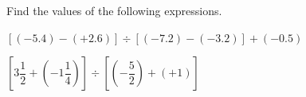  Find the values of the following expressions.

\begin{subparts}
  \item $[(-5.4)-(+2.6)]\div[(-7.2)-(-3.2)]+(-0.5)$

  \item $\left[3\dfrac{1}{2}+\left(-1\dfrac{1}{4}\right)\right]\div\left[\left(-\dfrac{5}{2}\right)+(+1)\right]$
\end{subparts}

